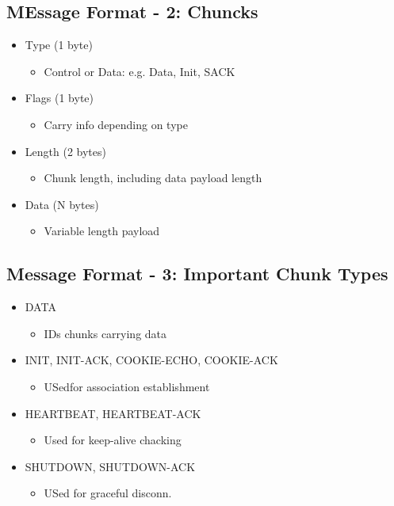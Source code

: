 \subsection{MEssage Format - 2: Chuncks}
\begin{itemize}
	\item Type (1 byte)
	\begin{itemize}
		\item Control or Data: e.g. Data, Init, SACK
	\end{itemize}
\item Flags (1 byte)
	\begin{itemize}
		\item Carry info depending on type
	\end{itemize}
\item Length (2 bytes)
	\begin{itemize}
		\item Chunk length, including data payload length
	\end{itemize}
\item Data (N bytes)
	\begin{itemize}
		\item Variable length payload
	\end{itemize}
\end{itemize}
\subsection{Message Format - 3: Important Chunk Types}
\begin{itemize}
	\item DATA
	\begin{itemize}
		\item IDs chunks carrying data
	\end{itemize}
	\item INIT, INIT-ACK, COOKIE-ECHO, COOKIE-ACK
	\begin{itemize}
		\item USedfor association establishment
	\end{itemize}
	\item HEARTBEAT, HEARTBEAT-ACK
	\begin{itemize}
		\item Used for keep-alive chacking
	\end{itemize}
	\item SHUTDOWN, SHUTDOWN-ACK
	\begin{itemize}
		\item USed for graceful disconn.
	\end{itemize}
\end{itemize}
